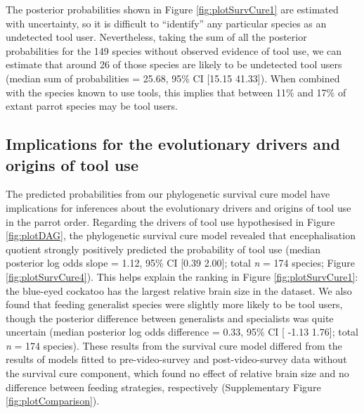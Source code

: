 \documentclass[
  man,floatsintext]{apa6}
\begin{document}
The posterior probabilities shown in Figure \ref{fig:plotSurvCure1} are
estimated with uncertainty, so it is difficult to ``identify'' any particular
species as an undetected tool user. Nevertheless, taking the sum of all the
posterior probabilities for the
149 species without
observed evidence of tool use, we can estimate that around
26 of those species are likely to be
undetected tool users (median sum of probabilities =
25.68, 95\% CI
{[}15.15
41.33{]}). When combined with the
species known to use tools, this implies that between 11\% and 17\% of extant
parrot species may be tool users.

\hypertarget{implications-for-the-evolutionary-drivers-and-origins-of-tool-use}{%
\subsection{Implications for the evolutionary drivers and origins of tool use}\label{implications-for-the-evolutionary-drivers-and-origins-of-tool-use}}

The predicted probabilities from our phylogenetic survival cure model have
implications for inferences about the evolutionary drivers and origins of tool
use in the parrot order. Regarding the drivers of tool use hypothesised in
Figure \ref{fig:plotDAG}, the phylogenetic survival cure model revealed that
encephalisation quotient strongly positively predicted the probability of tool
use (median posterior log odds slope = 1.12, 95\%
CI {[}0.39
2.00{]}; total \emph{n} = 174
species; Figure \ref{fig:plotSurvCure4}). This helps explain the ranking in
Figure \ref{fig:plotSurvCure1}: the blue-eyed cockatoo has the largest relative
brain size in the dataset. We also found that feeding generalist species were
slightly more likely to be tool users, though the posterior difference between
generalists and specialists was quite uncertain (median posterior log odds
difference = 0.33, 95\% CI {[}
-1.13 1.76{]}; total
\emph{n} = 174 species). These results from the survival cure model
differed from the results of models fitted to pre-video-survey and
post-video-survey data without the survival cure component, which found no
effect of relative brain size and no difference between feeding strategies,
respectively (Supplementary Figure \ref{fig:plotComparison}).
\end{document}
